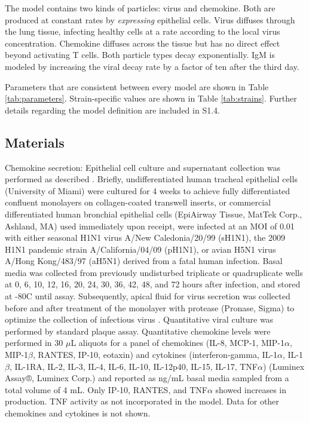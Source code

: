 \documentclass[10pt]{article}
\begin{document}
The model contains two kinds of particles: virus and chemokine. Both are produced at constant rates by \textit{expressing} epithelial cells.  Virus diffuses through the lung tissue, infecting healthy cells at a rate according to the local virus concentration. Chemokine diffuses across the tissue but has no direct effect beyond activating T cells. Both particle types decay exponentially.  IgM is modeled by increasing the viral decay rate by a factor of ten after the third day.

Parameters that are consistent between every model are shown in Table \ref{tab:parameters}.  Strain-specific values are shown in Table \ref{tab:strains}.  Further details regarding the model definition are included in S1.4.


\subsection*{Materials}

Chemokine secretion:  Epithelial cell culture and supernatant collection was performed as described \cite{Mitchell2011}.  Briefly, undifferentiated human tracheal epithelial cells (University of Miami) were cultured for 4 weeks to achieve fully differentiated confluent monolayers on collagen-coated transwell inserts, or commercial differentiated human bronchial epithelial cells (EpiAirway Tissue, MatTek Corp., Ashland, MA) used immediately upon receipt, were infected at an MOI of 0.01 with either seasonal H1N1 virus A/New Caledonia/20/99 (sH1N1), the 2009 H1N1 pandemic strain A/California/04/09 (pH1N1), or avian H5N1 virus A/Hong Kong/483/97 (aH5N1) derived from a fatal human infection.  Basal media was collected from previously undisturbed triplicate or quadruplicate wells at 0, 6, 10, 12, 16, 20, 24, 30, 36, 42, 48, and 72 hours after infection, and stored at -80C until assay.  Subsequently, apical fluid for virus secretion was collected before and after treatment of the monolayer with protease (Pronase, Sigma) to optimize the collection of infectious virus \cite{Mitchell2011}.  Quantitative viral culture was performed by standard plaque assay.  Quantitative chemokine levels were performed in 30 $\mu$L aliquots for a panel of chemokines (IL-8, MCP-1, MIP-1$\alpha$, MIP-1$\beta$, RANTES, IP-10, eotaxin) and cytokines (interferon-gamma, IL-1$\alpha$, IL-1$\beta$, IL-1RA, IL-2, IL-3, IL-4, IL-6, IL-10, IL-12p40, IL-15, IL-17, TNF$\alpha$) (Luminex Assay®, Luminex Corp.) and reported as ng/mL basal media sampled from a total volume of 4 mL.  Only IP-10, RANTES, and TNF$\alpha$ showed increases in production.  TNF activity as not incorporated in the model.  Data for other chemokines and cytokines is not shown.
\end{document}
